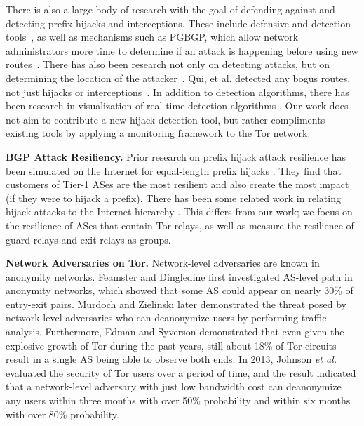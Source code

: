 \documentclass{acm_proc_article-sp}
\begin{document}
There is also a large body of research with the goal of defending against and detecting prefix hijacks and interceptions.  These include defensive and detection tools~\cite{lad2006phas, hu2007accurate, shi2012detecting, zhang2008ispy, zheng2007light, sriram2009comparative, zhang2007practical}, as well as mechanisms such as PGBGP, which allow network administrators more time to determine if an attack is happening before using new routes~\cite{karlin2006pretty}.  There has also been research not only on detecting attacks, but on determining the location of the attacker~\cite{qiu2009locating}.  Qui, et al. detected any bogus routes, not just hijacks or interceptions~\cite{qiu2007detecting}.  In addition to detection algorithms, there has been research in visualization of real-time detection algorithms \cite{teoh2006bgp}.  Our work does not aim to contribute a new hijack detection tool, but rather compliments existing tools by applying a monitoring framework to the Tor network.  

{\bf BGP Attack Resiliency.}
Prior research on prefix hijack attack resilience has been simulated on the Internet for equal-length prefix hijacks \cite{lad2007understanding}.  They find that customers of Tier-1 ASes are the most resilient and also create the most impact (if they were to hijack a prefix).  There has been some related work in relating hijack attacks to the Internet hierarchy \cite{zhao2012relation, zhao2012analysis}.  This differs from our work; we focus on the resilience of ASes that contain Tor relays, as well as measure the resilience of guard relays and exit relays as groups.

{\bf Network Adversaries on Tor.}
Network-level adversaries are known in anonymity networks. Feamster and Dingledine \cite{feamster2004location} first investigated AS-level path in anonymity networks, which showed that some AS could appear on nearly 30\% of entry-exit pairs. Murdoch and Zielinski \cite{murdoch2007sampled} later demonstrated the threat posed by network-level adversaries who can deanonymize users by performing traffic analysis. Furthermore, Edman and Syverson \cite{edman2009awareness} demonstrated that even given the explosive growth of Tor during the past years, still about 18\% of Tor circuits result in a single AS being able to observe both ends. In 2013, Johnson \emph{et al.} \cite{johnson2013users} evaluated the security of Tor users over a period of time, and the result indicated that a network-level adversary with just low bandwidth cost can deanonymize any users within three months with over 50\% probability and within six months with over 80\% probability.
\end{document}
